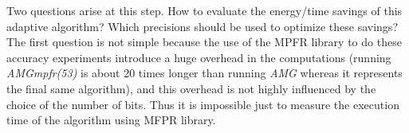    Two questions arise at this step. How to evaluate the energy/time savings of this adaptive algorithm? Which precisions should be used to optimize these savings?\\
   The first question is not simple because the use of the MPFR library to do these accuracy experiments introduce a huge overhead in the computations (running \emph{AMGmpfr(53)} is about 20 times longer than running \emph{AMG} whereas it
   represents the final same algorithm), and this overhead is not highly influenced by the choice of the number of bits. Thus it is impossible just to measure the execution time of the algorithm using MFPR library.
